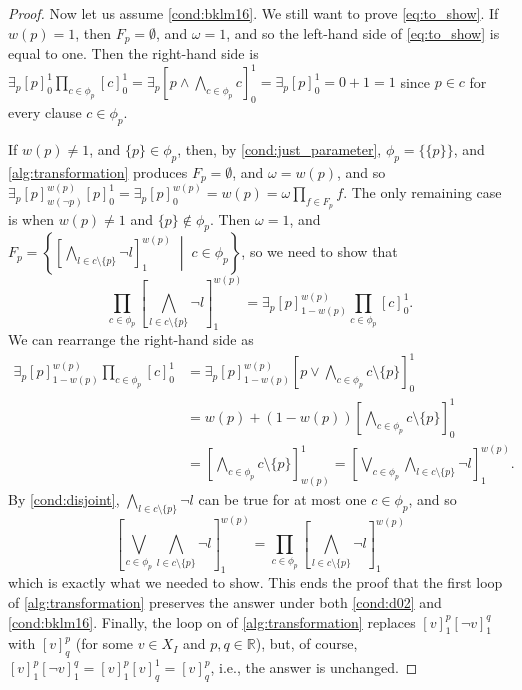 \begin{proof}
  Now let us assume \cref{cond:bklm16}. We still want to prove
  \cref{eq:to_show}. If $w(p) = 1$, then $F_p = \emptyset$, and $\omega = 1$,
  and so the left-hand side of \cref{eq:to_show} is equal to one. Then the
  right-hand side is $\exists_p [p]_0^1 \prod_{c \in \phi_p} [c]_0^1 = \exists_p
  \left[ p \land \bigwedge_{c \in \phi_p} c \right]_0^1 = \exists_p [p]_0^1 = 0
  + 1 = 1$ since $p \in c$ for every clause $c \in \phi_p$.

  If $w(p) \ne 1$, and $\{ p \} \in \phi_p$, then, by
  \cref{cond:just_parameter}, $\phi_p = \{ \{ p \} \}$, and
  \cref{alg:transformation} produces $F_p = \emptyset$, and $\omega = w(p)$, and
  so $\exists_p [p]_{w(\neg p)}^{w(p)} [p]_0^1 = \exists_p [p]^{w(p)}_0 = w(p) =
  \omega \prod_{f \in F_p} f$. The only remaining case is when $w(p) \ne 1$ and
  $\{ p \} \not \in \phi_p$. Then $\omega = 1$, and $F_p = \left\{
    \left[\bigwedge_{l \in c \setminus \{ p \}} \neg l\right]_1^{w(p)}
    \;\middle|\; c \in \phi_p \right\}$, so we need to show that
    \[
    \prod_{c \in \phi_p} \left[\bigwedge_{l \in c \setminus \{p \}} \neg l\right]_1^{w(p)} = \exists_p [p]_{1-w(p)}^{w(p)} \prod_{c \in \phi_p} [c]_0^1.
    \]
    We can rearrange the right-hand side as
  \begin{align*}
    \exists_p [p]_{1-w(p)}^{w(p)} \prod_{c \in \phi_p} [c]_0^1 &= \exists_p [p]_{1-w(p)}^{w(p)} \left[ p \lor \bigwedge_{c \in \phi_p} c \setminus \{ p \} \right]_0^1 \\
                                                               &= w(p) + (1-w(p)) \left[ \bigwedge_{c \in \phi_p} c \setminus \{ p \} \right]_0^1 \\
                                                               &= \left[ \bigwedge_{c \in \phi_p} c \setminus \{ p \} \right]_{w(p)}^1 = \left[ \bigvee_{c \in \phi_p} \bigwedge_{l \in c \setminus \{ p \}} \neg l \right]_1^{w(p)}.
  \end{align*}
   By \cref{cond:disjoint}, $\bigwedge_{l \in c \setminus \{ p \}} \neg l$ can
   be true for at most one $c \in \phi_p$, and so
   \[
   \left[ \bigvee_{c \in \phi_p} \bigwedge_{l \in c \setminus \{ p \}} \neg l \right]_1^{w(p)} = \prod_{c \in \phi_p} \left[ \bigwedge_{l \in c \setminus \{ p \}} \neg l \right]_1^{w(p)}
   \]
   which is exactly what we needed to show. This ends the proof that the first loop of \cref{alg:transformation} preserves the answer under both \cref{cond:d02} and \cref{cond:bklm16}. Finally, the loop on  of \cref{alg:transformation} replaces $[v]_1^p[\neg v]_1^q$ with $[v]_q^p$ (for some $v \in X_I$ and $p, q \in \mathbb{R}$), but, of course, $[v]_1^p[\neg v]_1^q = [v]_1^p[v]_q^1 = [v]_q^p$, i.e., the answer is unchanged.
\end{proof}

